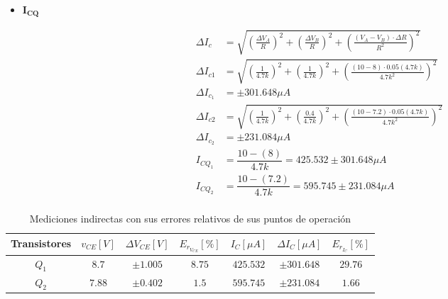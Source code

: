 \begin{enumerate}
\begin{itemize}
          \item $\mathbf{I_{CQ}}$

                \begin{align*}
                  \Delta I_{c}   & = \sqrt{\left(\frac{\Delta V_{A}}{R}\right)^2 + \left(\frac{\Delta V_{B}}{R}\right)^2 + \left(\frac{(V_{A} - V_{B}) \cdot \Delta R}{R^2}\right)^2} \\[0.2cm]
                  \Delta I_{c1}  & = \sqrt{\left(\frac{1}{4.7k}\right)^2 + \left(\frac{1}{4.7k}\right)^2 + \left(\frac{(10-8) \cdot 0.05(4.7k)}{4.7k^2}\right)^2}                     \\[0.2cm]
                  \Delta I_{c_1} & =\pm 301.648\mu A                                                                                                                                  \\[1cm]
                  \Delta I_{c2}  & = \sqrt{\left(\frac{1}{4.7k}\right)^2 + \left(\frac{0.4}{4.7k}\right)^2 + \left(\frac{(10-7.2) \cdot 0.05(4.7k)}{4.7k^2}\right)^2}                 \\[0.2cm]
                  \Delta I_{c_2} & =\pm 231.084 \mu A                                                                                                                                 \\[1cm]
                  I_{CQ_1}       & =\dfrac{10-(8)}{4.7k}=425.532 \pm 301.648\mu A                                                                                                     \\[1cm]
                  I_{CQ_2}       & =\dfrac{10-(7.2)}{4.7k}=595.745 \pm 231.084\mu A                                                                                                   \\[1cm]
                \end{align*}

        \end{itemize}

        \begin{table}[H]
          \centering
          \begin{tabular}{|c|c|c|c|c|c|c|}
            \hline
            \textbf{Transistores} & $v_{CE} [V]$ & $\Delta V_{CE} [V]$ & $E_{r_{V_{CE}}} [\%]$ & $I_{C} [\mu A]$ & $\Delta I_{C} [\mu A]$ & $E_{r_{I_{C}}} [\%]$ \\
            \hline
            $Q_1$                 & $8.7$        & $\pm 1.005 $        & $8.75$                & $425.532$       & $\pm 301.648$          & $29.76$              \\
            \hline
            $Q_2$                 & $7.88$       & $\pm 0.402$         & $1.5$                 & $595.745$       & $\pm 231.084$          & $1.66$               \\
            \hline
          \end{tabular}
          \caption{Mediciones indirectas con sus errores relativos de sus puntos de operación }
          \label{tab:puntos_operacion_experimental_maserror_parte2}
        \end{table}


\end{enumerate}
